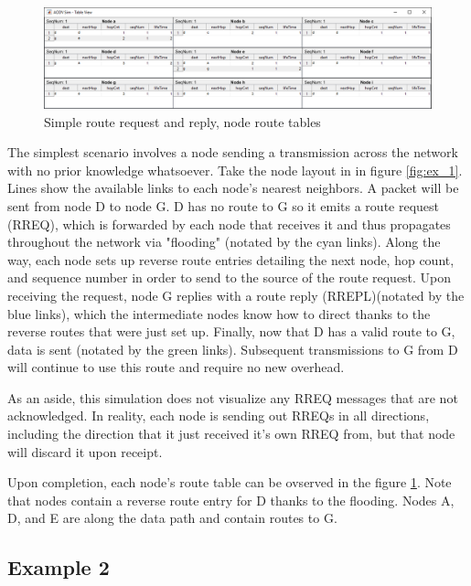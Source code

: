 \documentclass[conference]{IEEEtran}
\begin{document}
\begin{figure}[ht]
	\centering
	\includegraphics[width=6.8in]{Ex_1_table.png}
	\caption{Simple route request and reply, node route tables}
	\label{fig:ex_1_table}
\end{figure}

The simplest scenario involves a node sending a transmission across the network with no prior knowledge whatsoever. Take the node layout in in figure \ref{fig:ex_1}. Lines show the available links to each node's nearest neighbors. A packet will be sent from node D to node G. D has no route to G so it emits a route request (RREQ), which is forwarded by each node that receives it and thus propagates throughout the network via "flooding" (notated by the cyan links). Along the way, each node sets up reverse route entries detailing the next node, hop count, and sequence number in order to send to the source of the route request. Upon receiving the request, node G replies with a route reply (RREPL)(notated by the blue links), which the intermediate nodes know how to direct thanks to the reverse routes that were just set up. Finally, now that D has a valid route to G, data is sent (notated by the green links). Subsequent transmissions to G from D will continue to use this route and require no new overhead.

As an aside, this simulation does not visualize any RREQ messages that are not acknowledged. In reality, each node is sending out RREQs in all directions, including the direction that it just received it's own RREQ from, but that node will discard it upon receipt.

Upon completion, each node's route table can be ovserved in the figure \ref{fig:ex_1_table}. Note that nodes contain a reverse route entry for D thanks to the flooding. Nodes  A, D, and E are along the data path and contain routes to G.

\subsection{Example 2}
\end{document}
